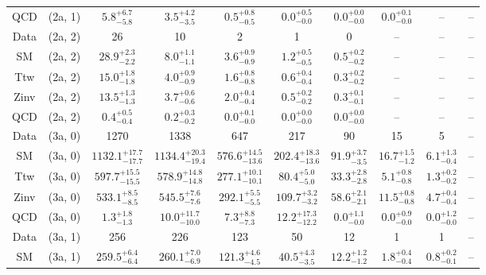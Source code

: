 \begin{table}[h!]
{\begin{tabular}{cccccccccc}
	QCD & (2a, 1) & $5.8^{+ 6.7 }_{- 5.8 }$ & $3.5^{+ 4.2 }_{- 3.5 }$ & $0.5^{+ 0.8 }_{- 0.5 }$ & $0.0^{+ 0.5 }_{- 0.0 }$ & $0.0^{+ 0.0 }_{- 0.0 }$ & $0.0^{+ 0.1 }_{- 0.0 }$ & -- & -- \\[0.5ex] 
	Data & (2a, 2) & 26 & 10 & 2 & 1 & 0 & -- & -- & -- \\[0.5ex] 
	SM & (2a, 2) & $28.9^{+ 2.3 }_{- 2.2 }$ & $8.0^{+ 1.1 }_{- 1.1 }$ & $3.6^{+ 0.9 }_{- 0.9 }$ & $1.2^{+ 0.5 }_{- 0.5 }$ & $0.5^{+ 0.2 }_{- 0.2 }$ & -- & -- & -- \\[0.5ex] 
	Ttw & (2a, 2) & $15.0^{+ 1.8 }_{- 1.8 }$ & $4.0^{+ 0.9 }_{- 0.9 }$ & $1.6^{+ 0.8 }_{- 0.8 }$ & $0.6^{+ 0.4 }_{- 0.4 }$ & $0.3^{+ 0.2 }_{- 0.2 }$ & -- & -- & -- \\[0.5ex] 
	Zinv & (2a, 2) & $13.5^{+ 1.3 }_{- 1.3 }$ & $3.7^{+ 0.6 }_{- 0.6 }$ & $2.0^{+ 0.4 }_{- 0.4 }$ & $0.5^{+ 0.2 }_{- 0.2 }$ & $0.3^{+ 0.1 }_{- 0.1 }$ & -- & -- & -- \\[0.5ex] 
	QCD & (2a, 2) & $0.4^{+ 0.5 }_{- 0.4 }$ & $0.2^{+ 0.3 }_{- 0.2 }$ & $0.0^{+ 0.1 }_{- 0.0 }$ & $0.0^{+ 0.0 }_{- 0.0 }$ & $0.0^{+ 0.0 }_{- 0.0 }$ & -- & -- & -- \\[0.5ex] 
	Data & (3a, 0) & 1270 & 1338 & 647 & 217 & 90 & 15 & 5 & -- \\[0.5ex] 
	SM & (3a, 0) & $1132.1^{+ 17.7 }_{- 17.7 }$ & $1134.4^{+ 20.3 }_{- 19.4 }$ & $576.6^{+ 14.5 }_{- 13.6 }$ & $202.4^{+ 18.3 }_{- 13.6 }$ & $91.9^{+ 3.7 }_{- 3.5 }$ & $16.7^{+ 1.5 }_{- 1.2 }$ & $6.1^{+ 1.3 }_{- 0.4 }$ & -- \\[0.5ex] 
	Ttw & (3a, 0) & $597.7^{+ 15.5 }_{- 15.5 }$ & $578.9^{+ 14.8 }_{- 14.8 }$ & $277.1^{+ 10.1 }_{- 10.1 }$ & $80.4^{+ 5.0 }_{- 5.0 }$ & $33.3^{+ 2.8 }_{- 2.8 }$ & $5.1^{+ 0.8 }_{- 0.8 }$ & $1.3^{+ 0.2 }_{- 0.2 }$ & -- \\[0.5ex] 
	Zinv & (3a, 0) & $533.1^{+ 8.5 }_{- 8.5 }$ & $545.5^{+ 7.6 }_{- 7.6 }$ & $292.1^{+ 5.5 }_{- 5.5 }$ & $109.7^{+ 3.2 }_{- 3.2 }$ & $58.6^{+ 2.1 }_{- 2.1 }$ & $11.5^{+ 0.8 }_{- 0.8 }$ & $4.7^{+ 0.4 }_{- 0.4 }$ & -- \\[0.5ex] 
	QCD & (3a, 0) & $1.3^{+ 1.8 }_{- 1.3 }$ & $10.0^{+ 11.7 }_{- 10.0 }$ & $7.3^{+ 8.8 }_{- 7.3 }$ & $12.2^{+ 17.3 }_{- 12.2 }$ & $0.0^{+ 1.1 }_{- 0.0 }$ & $0.0^{+ 0.9 }_{- 0.0 }$ & $0.0^{+ 1.2 }_{- 0.0 }$ & -- \\[0.5ex] 
	Data & (3a, 1) & 256 & 226 & 123 & 50 & 12 & 1 & 1 & -- \\[0.5ex] 
	SM & (3a, 1) & $259.5^{+ 6.4 }_{- 6.4 }$ & $260.1^{+ 7.0 }_{- 6.9 }$ & $121.3^{+ 4.6 }_{- 4.5 }$ & $40.5^{+ 4.3 }_{- 3.5 }$ & $12.2^{+ 1.2 }_{- 1.2 }$ & $1.8^{+ 0.4 }_{- 0.4 }$ & $0.8^{+ 0.2 }_{- 0.1 }$ & -- \\[0.5ex] 

\end{tabular}}
\end{table}
